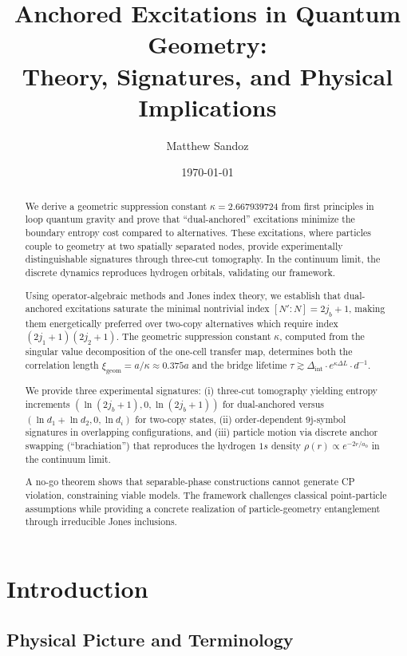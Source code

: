 \documentclass[11pt]{article}
\title{Anchored Excitations in Quantum Geometry: \\ Theory, Signatures, and Physical Implications}
\author{Matthew Sandoz}
\date{\today}
\theoremstyle{plain}
\theoremstyle{definition}
\begin{document}
\pagestyle{plain}
\maketitle

\begin{abstract}
  We derive a geometric suppression constant $\kappa = 2.667939724$ from first principles in loop quantum gravity and prove that ``dual-anchored'' excitations minimize the boundary entropy cost compared to alternatives. These excitations, where particles couple to geometry at two spatially separated nodes, provide experimentally distinguishable signatures through three-cut tomography. In the continuum limit, the discrete dynamics reproduces hydrogen orbitals, validating our framework.

  Using operator-algebraic methods and Jones index theory, we establish that dual-anchored excitations saturate the minimal nontrivial index $[N':N] = 2j_b+1$, making them energetically preferred over two-copy alternatives which require index $(2j_1+1)(2j_2+1)$. The geometric suppression constant $\kappa$, computed from the singular value decomposition of the one-cell transfer map, determines both the correlation length $\xi_{\text{geom}} = a/\kappa \approx 0.375a$ and the bridge lifetime $\tau \gtrsim \Delta_{\text{int}} \cdot e^{\kappa \Delta L} \cdot d^{-1}$.

  We provide three experimental signatures: (i) three-cut tomography yielding entropy increments $(\ln(2j_b+1), 0, \ln(2j_b+1))$ for dual-anchored versus $(\ln d_1 + \ln d_2, 0, \ln d_i)$ for two-copy states, (ii) order-dependent 9j-symbol signatures in overlapping configurations, and (iii) particle motion via discrete anchor swapping (``brachiation'') that reproduces the hydrogen $1s$ density $\rho(r) \propto e^{-2r/a_0}$ in the continuum limit.

  A no-go theorem shows that separable-phase constructions cannot generate CP violation, constraining viable models. The framework challenges classical point-particle assumptions while providing a concrete realization of particle-geometry entanglement through irreducible Jones inclusions.
\end{abstract}

\section{Introduction}
\label{sec:intro}

\subsection{Physical Picture and Terminology}
\end{document}

